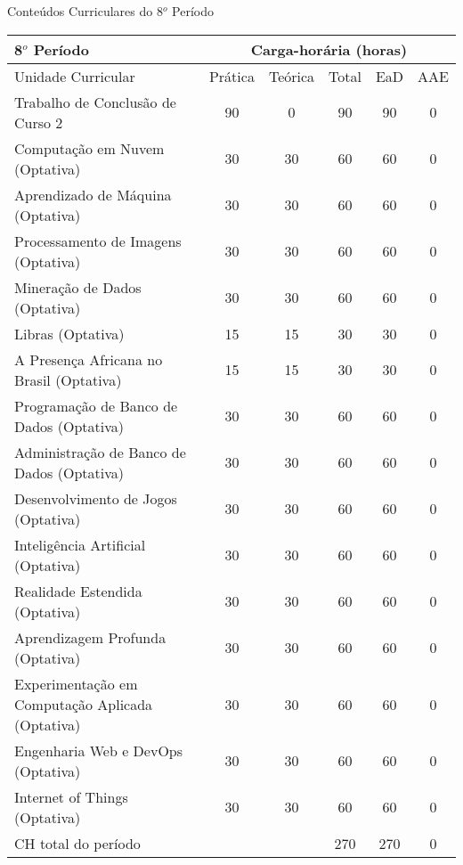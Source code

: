 \begin{quadro}[ht!]
\centering
\caption{Conteúdos Curriculares do 8$^o$ Período}\label{qua:periodo8}
\begin{tabular}{|p{5.0cm}|c|c|c|c|c|}
\hline
\rowcolor{blue1} 8$^o$ Período & \multicolumn{5}{|c|}{\centering Carga-horária (horas)} \\ \hline
\rowcolor{blue1} Unidade Curricular & Prática & Teórica & Total & EaD & AAE \\ \hline
Trabalho de Conclusão de Curso 2 & 90 & 0 & 90 & 90	&	0 \\	\hline
Computação em Nuvem (Optativa) & 30 & 30 & 60 & 60	&	0 \\	\hline
Aprendizado de Máquina (Optativa) & 30 & 30 & 60 & 60	&	0 \\	\hline
Processamento de Imagens (Optativa) & 30 & 30 & 60 & 60	&	0 \\	\hline
Mineração de Dados (Optativa) & 30 & 30 & 60 & 60	&	0 \\	\hline
Libras (Optativa) & 15 & 15 & 30 & 30	&	0 \\	\hline
A Presença Africana no Brasil (Optativa) & 15 & 15 & 30 & 30	&	0 \\	\hline
Programação de Banco de Dados (Optativa) & 30 & 30 & 60 & 60	&	0 \\	\hline
Administração de Banco de Dados (Optativa) & 30 & 30 & 60 & 60	&	0 \\	\hline
Desenvolvimento de Jogos (Optativa) & 30 & 30 & 60 & 60	&	0 \\	\hline
Inteligência Artificial (Optativa) & 30 & 30 & 60 & 60	&	0 \\	\hline
Realidade Estendida (Optativa) & 30 & 30 & 60 & 60	&	0 \\	\hline
Aprendizagem Profunda (Optativa) & 30 & 30 & 60 & 60	&	0 \\	\hline
Experimentação em Computação Aplicada (Optativa) & 30 & 30 & 60 & 60	&	0 \\	\hline
Engenharia Web e DevOps (Optativa) & 30 & 30 & 60 & 60	&	0 \\	\hline
Internet of Things (Optativa) & 30 & 30 & 60 & 60	&	0 \\	\hline
CH total do período & \multicolumn{2}{p{3.3cm}|}{\cellcolor{blue1}} & 270 & 270	&	0 \\ \hline
\end{tabular} \end{quadro}